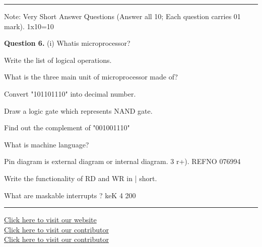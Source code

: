\documentclass[11pt,a4paper]{article}
\begin{document}
\bigskip{}
\rule{\linewidth}{0.4pt}\smallskip

Note: Very Short Answer Questions (Answer all
10; Each question carries 01 mark).
1x10=10

\medskip\noindent\textbf{Question 6.} (i) Whatis microprocessor?
  \begin{parts}
    \item Write the list of logical operations.
    \item What is the three main unit of
    microprocessor made of?
    \item Convert "101101110" into decimal
    number.
    \item Draw a logic gate which represents NAND
    gate.
    \item Find out the complement of "001001110"
    \item What is machine language?
    \item Pin diagram is external diagram or
    internal diagram.
    3 r+).
    REFNO 076994
    \item Write the functionality of RD and WR in |
    short.
    \item What are maskable interrupts ?
    keK
    4 200
  \end{parts}

\vfill
\rule{\linewidth}{0.4pt}
\begin{center}\small
\href{https://bhu-exam.vercel.app/}{Click here to visit our website}\\[4pt]\href{https://me-aryan.vercel.app/}{Click here to visit our contributor}\\[4pt]\href{https://quashan-me.vercel.app/}{Click here to visit our contributor}
\end{center}
\end{document}
